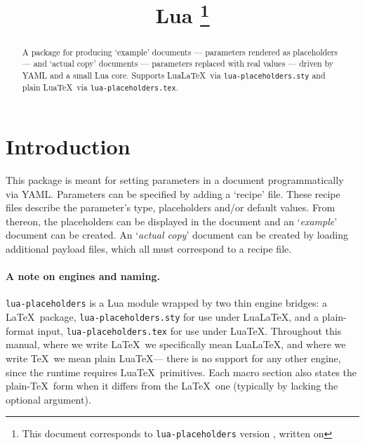 \documentclass{ltxdoc}
\begin{document}
    \title{Lua \thanks{This document corresponds to \texttt{lua-placeholders} version \gitversion, written on \gitdate}}
    \maketitle
    \begin{abstract}
        A package for producing `example' documents --- parameters rendered as placeholders --- and `actual copy' documents --- parameters replaced with real values --- driven by YAML and a small Lua core.
        Supports Lua\LaTeX\ via \texttt{lua-placeholders.sty} and plain Lua\TeX\ via \texttt{lua-placeholders.tex}.
    \end{abstract}

    \tableofcontents

    \clearpage

    \section{Introduction}
    This package is meant for setting parameters in a document programmatically via YAML\@.
    Parameters can be specified by adding a `recipe' file.
    These recipe files describe the parameter's type, placeholders and/or default values.
    From thereon, the placeholders can be displayed in the document and an `\textit{example}' document can be created.
    An `\textit{actual copy}' document can be created by loading additional payload files, which all must correspond to a recipe file.

    \paragraph{A note on engines and naming.}
    \texttt{lua-placeholders} is a Lua module wrapped by two thin engine bridges: a \LaTeX\ package, \texttt{lua-placeholders.sty} for use under Lua\LaTeX, and a plain-format input, \texttt{lua-placeholders.tex} for use under Lua\TeX.
    Throughout this manual, where we write \LaTeX\ we specifically mean Lua\LaTeX, and where we write \TeX\ we mean plain Lua\TeX --- there is no support for any other engine, since the runtime requires Lua\TeX\ primitives.
    Each macro section also states the plain-\TeX\ form when it differs from the \LaTeX\ one (typically by lacking the optional  argument).
\end{document}

